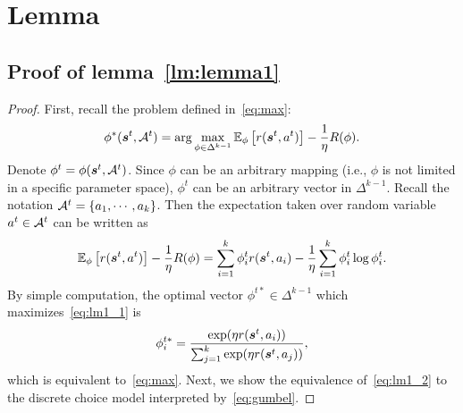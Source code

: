 \documentclass{article} %
\begin{document}
\newpage



\newpage

\appendix
\section{Lemma}\label{app:proof}
\subsection{Proof of lemma~\ref{lm:lemma1}} 
\primelemma*
\begin{proof}
First, recall the problem defined in~\eqref{eq:max}:
\[
\phi^*({\bm{s}}^t,{\mathcal{A}}^t) = \arg\max_{\phi \in \Delta^{k-1}} \mathbb{E}_{\phi} \left[r({\bm{s}}^t, a^t) \right] -\frac{1}{\eta}R(\phi).
\]
Denote $\phi^t = \phi({\bm{s}}^t,{\mathcal{A}}^t)$. Since $\phi$ can be an arbitrary mapping (i.e., $\phi$ is not limited in a specific parameter space), $\phi^t$ can be an arbitrary vector in $\Delta^{k-1}$. Recall the notation ${\mathcal{A}}^t = \{a_1,\cdots, a_k\}$. Then the expectation taken over random variable $a^t\in {\mathcal{A}}^t$ can be written as
\begin{equation}\label{eq:lm1_1}
     \mathbb{E}_{\phi} \left[r({\bm{s}}^t, a^t) \right] -\frac{1}{\eta}R(\phi) =\sum_{i=1}^k \phi_i^tr({\bm{s}}^t, a_i) -\frac{1}{\eta} \sum_{i=1}^k \phi_i^t \log \phi_i^t.
\end{equation}
By simple computation, the optimal vector $\phi^{t*}\in \Delta^{k-1}$ which maximizes~\eqref{eq:lm1_1} is
\begin{equation}\label{eq:lm1_2}
    \phi_i^{t*} =\dfrac{\exp(\eta r({\bm{s}}^t, a_i))}{\sum_{j=1}^{k}\exp(\eta r({\bm{s}}^t, a_j))},
\end{equation}
which is equivalent to~\eqref{eq:max}. Next, we show the equivalence of~\eqref{eq:lm1_2} to the discrete choice model interpreted by~\eqref{eq:gumbel}.


\end{proof}
\end{document}
